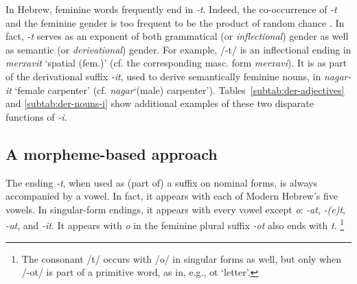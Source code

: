 In Hebrew, feminine words frequently 
end in \textit{-t}. Indeed, the co-occurrence of \textit{-t} and the feminine gender is 
too frequent to be the product of random chance \citep{faust:2013}.
In fact, \textit{-t} serves as an exponent of both grammatical (or \emph{inflectional}) 
gender as well as semantic (or \emph{derivational}) gender. For example, /-t/ 
is an inflectional ending in \textit{merxavit} `spatial (fem.)' 
(cf. the corresponding masc. form \textit{merxavi}). 
It is as part of the derivational suffix \textit{-it}, used to 
derive semantically feminine nouns, in \textit{nagar-it} 
`female carpenter' (cf. \textit{nagar}`(male) carpenter'). 
Tables~\ref{subtab:der-adjectives} and \ref{subtab:der-nouns-i} 
show additional
examples of these two disparate functions of \textit{-i}.

\subsection{A morpheme-based approach}
The ending \textit{-t}, when used as (part of) a suffix on 
nominal forms, is always accompanied by a vowel. 
In fact, it appears with each of Modern Hebrew's five vowels.
In singular-form endings, it appears with every vowel except 
\textit{o}: \textit{-at}, \textit{-(e)t}, \textit{-ut}, and \textit{-it}. 
It appears with \textit{o} in the feminine plural suffix \textit{-ot} 
also ends with \textit{t}. \footnote{The consonant /t/ occurs with 
/o/ in singular forms as well, but only when /-ot/ is part of a 
primitive word, as in, e.g., ot `letter'.}


